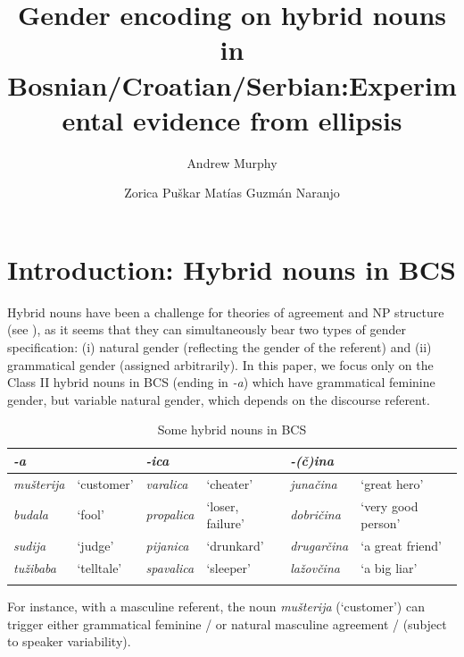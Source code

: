 \documentclass[output=paper,
modfonts,
newtxmath,
hidelinks
]{langscibook}
\title{Gender encoding on hybrid nouns in Bosnian\slash Croatian\slash Serbian:\newlineCover Experimental evidence from ellipsis}
\author{%
 Andrew Murphy\affiliation{University of Leipzig}\and 
 Zorica Puškar\affiliation{Leibniz-Zentrum Allgemeine Sprachwissenschaft, Berlin}\lastand 
 Matías Guzmán Naranjo\affiliation{Heinrich Heine University Düsseldorf}
}
\begin{document}
\maketitle
{}

\section{Introduction: Hybrid nouns in BCS}

Hybrid nouns have been a challenge for theories of agreement and NP structure (see \citealt{corbett91,wandz03,aandalfg,aandalanguage,pesetsky14,kramerbook,landau15,smith15,smith16,arsenijevicjuksek,despichybrid17}), as it seems that they can simultaneously bear two types of gender specification: 
(i) natural gender (reflecting the gender of the referent) and
(ii) grammatical gender (assigned arbitrarily). In this paper, we focus only on the Class II hybrid nouns in BCS (ending in \textit{-a}) which have grammatical feminine gender, but variable natural gender, which depends on the discourse referent.
	

\begin{table}
\caption{Some hybrid nouns in BCS}\label{t1}
\small
\begin{tabularx}{\textwidth}{llllll}
\lsptoprule
\textbf{\textit{-a}}&&\textbf{\textit{-ica}}&&\textbf{\textit{-(č)ina}}&\\
\midrule
\textit{mušterija} & `customer' &  \textit{varalica} & `cheater'  & \textit{junačina} & `great hero'\\  
\textit{budala} & `fool'  & \textit{propalica} & `loser, failure' & \textit{dobričina} & `very good person'\\
\textit{sudija} & `judge' & \textit{pijanica} & `drunkard'  & \textit{drugarčina} & `a great friend'\\
\textit{tužibaba} & `telltale' & \textit{spavalica} & `sleeper' & \textit{lažovčina} & `a big liar' \\
\lspbottomrule
\end{tabularx}
\end{table}

\noindent For instance, with a masculine referent, the noun \textit{mušterija} (`customer') can trigger either grammatical feminine  / or natural masculine agreement  / (subject to speaker variability).
	
\end{document}

